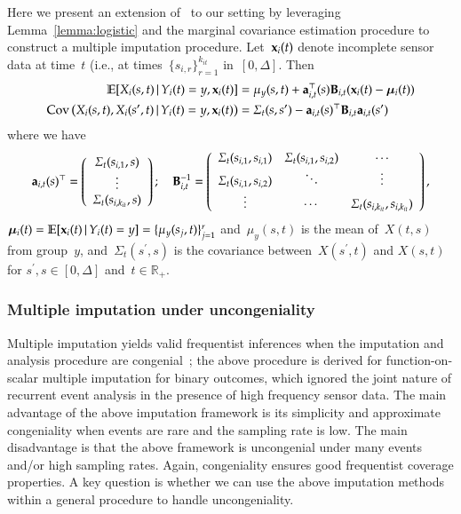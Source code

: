 \documentclass[12pt]{amsart}
\def\E{\mathcal{E}}
\def\E{\mathbb{E}}
\def\given{\, | \,}
\def\bfx{{\bf x}}
\def\bfT{{\bf T}}
\def\bfD{{\bf D}}
\begin{document}
Here we present an extension of~\cite{Petrovich2018} to our setting by leveraging Lemma~\ref{lemma:logistic} and the marginal covariance estimation procedure to construct a multiple imputation procedure. Let~$\bfx_{i} (t)$ denote incomplete sensor data at time~$t$ (i.e., at times~$\{ s_{i,r} \}_{r=1}^{k_{it}}$ in~$[0,\Delta]$. Then
\begin{align}
\label{eq:impute}
\E [ X_i (s,t) \given Y_i(t) = y, \bfx_i (t) ]
  &= \mu_y (s,t) + {\bf a}_{i,t}^\top (s) {\bf B}_{i,t} (\bfx_i (t) -
    \mathbold{\mu}_i (t) ) \\
\text{Cov} \left( X_i (s,t), X_i (s^\prime, t) \given Y_i (t) = y,
  \bfx_i (t) \right)
  &= \Sigma_{t} (s, s^\prime) -
    {\bf a}_{i,t} (s)^\top {\bf B}_{i,t} {\bf a}_{i,t} (s^\prime)
\end{align}
where we have
\[
{\bf a}_{i,t} (s)^\top = \left( \begin{array}{c} \Sigma_t (s_{i,1}, s) \\ \vdots \\
                       \Sigma_t (s_{i,k_{it}}, s) \end{array} \right); \quad
{\bf B}_{i,t}^{-1} = \left(
  \begin{array}{c c c}
    \Sigma_t(s_{i,1}, s_{i,1}) & \Sigma_t(s_{i,1}, s_{i,2}) & \cdots \\
    \Sigma_t(s_{i,1}, s_{i,2}) & \ddots & \vdots \\
    \vdots & \cdots & \Sigma_t (s_{i,k_{it}}, s_{i,k_{it}})
  \end{array} \right),
\]
$\mathbold{\mu}_i (t) = \E [ \bfx_i (t) \given Y_i (t) = y] = \{
\mu_y (s_{j}, t) \}_{j=1}^r$ and~$\mu_y (s,t)$ is the mean of~$X(t,s)$
from group~$y$, and~$\Sigma_t ( s^\prime, s)$ is the covariance
between~$X(s^\prime,t)$ and $X(s,t)$ for $s^\prime, s \in [0, \Delta]$
and~$t \in \mathbb{R}_+$. 

\subsubsection{Multiple imputation under uncongeniality}
\label{section:miuncong}

Multiple imputation yields valid frequentist inferences when the imputation and analysis procedure are congenial~\citep{Meng1994};  the above procedure is derived for function-on-scalar multiple imputation for binary outcomes, which ignored the joint nature of recurrent event analysis in the presence of high frequency sensor data. The main advantage of the above imputation framework is its simplicity and approximate congeniality when events are rare and the sampling rate is low.  The main disadvantage is that the above framework is uncongenial under many events and/or high sampling rates. Again, congeniality ensures good frequentist coverage properties.  A key question is whether we can use the above imputation methods within a general procedure to handle uncongeniality.
\end{document}
